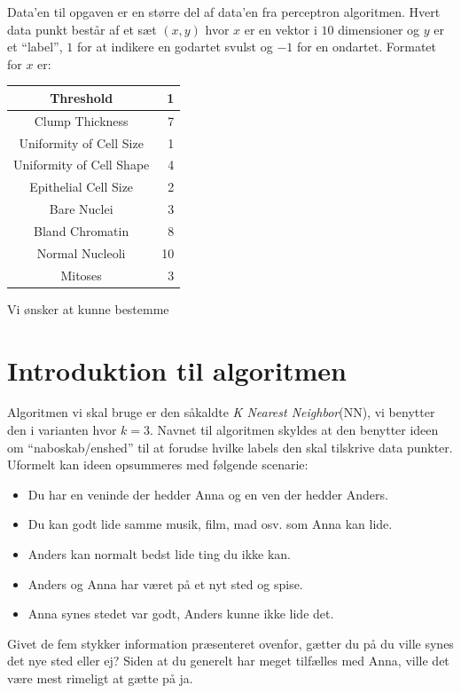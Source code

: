 \documentclass[14pt]{article}
\begin{document}
Data'en til opgaven er en større del af data'en fra perceptron algoritmen.
Hvert data punkt består af et sæt $(x, y)$ hvor $x$ er en vektor i $10$
dimensioner og $y$ er et ``label'', $1$ for at indikere en godartet svulst og
$-1$ for en ondartet. Formatet for $x$ er:
\begin{center}
    \begin{tabular}{| c | r |}
        \hline
        Threshold                & 1           \\ \hline
        Clump Thickness          & 7           \\ \hline
        Uniformity of Cell Size  & 1           \\ \hline
        Uniformity of Cell Shape & 4           \\ \hline
        Epithelial Cell Size     & 2           \\ \hline
        Bare Nuclei              & 3           \\ \hline
        Bland Chromatin          & 8           \\ \hline
        Normal Nucleoli          & 10          \\ \hline
        Mitoses                  & 3           \\ \hline
    \end{tabular}
\end{center}

Vi ønsker at kunne bestemme


\section*{Introduktion til algoritmen}
Algoritmen vi skal bruge er den såkaldte \emph{K Nearest Neighbor}(NN), vi
benytter den i varianten hvor $k=3$. Navnet til algoritmen skyldes at den
benytter ideen om ``naboskab/enshed'' til at forudse hvilke labels den skal
tilskrive data punkter. Uformelt kan ideen opsummeres med følgende scenarie:
\begin{itemize}
    \item Du har en veninde der hedder Anna og en ven der hedder Anders.
    \item Du kan godt lide samme musik, film, mad osv. som Anna kan lide.
    \item Anders kan normalt bedst lide ting du ikke kan.
    \item Anders og Anna har været på et nyt sted og spise.
    \item Anna synes stedet var godt, Anders kunne ikke lide det.
\end{itemize}
Givet de fem stykker information præsenteret ovenfor, gætter du på du ville
synes det nye sted eller ej? Siden at du generelt har meget tilfælles med Anna,
ville det være mest rimeligt at gætte på ja.
\end{document}
